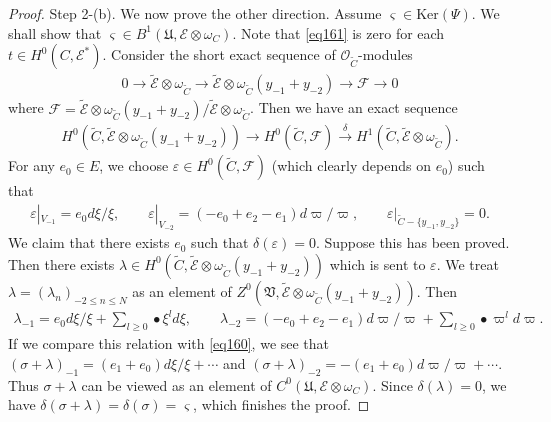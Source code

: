 \documentclass[12pt,a4paper,notitlepage]{report}
\theoremstyle{definition}
\theoremstyle{plain}
\newcommand{\fk}{\mathfrak}
\newcommand{\wtd}{\widetilde}
\newcommand{\scr}{\mathscr}
\newcommand{\sgm}{\varsigma}
\newcommand{\blt}{\bullet}
\newcommand{\Ker}{\mathrm{Ker}}
\numberwithin{equation}{section}
\begin{document}
\begin{proof}
Step 2-(b). We now prove the other direction. Assume $\sgm\in\Ker(\Psi)$. We shall show that $\sgm\in B^1(\fk U,\scr E\otimes\omega_C)$. Note that \eqref{eq161} is zero for each $t\in H^0(C,\scr E^*)$. Consider the short exact sequence of $\scr O_{\wtd C}$-modules
\begin{align*}
0\rightarrow\wtd{\scr E}\otimes\omega_{\wtd C}\rightarrow \wtd{\scr E}\otimes\omega_{\wtd C}(y_{-1}+y_{-2})\rightarrow \scr F\rightarrow 0
\end{align*}
where $\scr F=\wtd{\scr E}\otimes\omega_{\wtd C}(y_{-1}+y_{-2})/\wtd{\scr E}\otimes\omega_{\wtd C}$. Then we have an exact sequence
\begin{align*}
H^0(\wtd C,\wtd{\scr E}\otimes\omega_{\wtd C}(y_{-1}+y_{-2}))\rightarrow H^0(\wtd C,\scr F)\xrightarrow{\delta} H^1(\wtd C,\wtd{\scr E}\otimes\omega_{\wtd C}).
\end{align*}
For any $e_0\in E$, we choose $\varepsilon\in H^0(\wtd C,\scr F)$ (which clearly depends on $e_0$) such that
\begin{gather*}
\varepsilon|_{V_{-1}}=e_0d\xi/\xi,\qquad \varepsilon|_{V_{-2}}=(-e_0+e_2-e_1)d\varpi/\varpi ,\qquad  \varepsilon|_{\wtd C-\{y_{-1},y_{-2}\}}=0.
\end{gather*}
We claim that there exists $e_0$ such that $\delta(\varepsilon)=0$. Suppose this has been proved. Then there exists $\lambda\in H^0(\wtd C,\wtd{\scr E}\otimes\omega_{\wtd C}(y_{-1}+y_{-2}))$ which is sent to $\varepsilon$. We treat $\lambda=(\lambda_n)_{-2\leq n\leq N}$ as an element of $Z^0(\fk V,\wtd{\scr E}\otimes\omega_{\wtd C}(y_{-1}+y_{-2}))$. Then
\begin{align*}
\lambda_{-1}=e_0d\xi/\xi+\sum_{l\geq 0}\blt \xi^ld\xi,\qquad \lambda_{-2}=(-e_0+e_2-e_1)d\varpi/\varpi+\sum_{l\geq 0}\blt \varpi^ld\varpi.
\end{align*}
If we compare this relation with \eqref{eq160},  we see that $(\sigma+\lambda)_{-1}=(e_1+e_0)d\xi/\xi+\cdots$ and $(\sigma+\lambda)_{-2}=-(e_1+e_0)d\varpi/\varpi+\cdots$. Thus $\sigma+\lambda$ can be viewed as an element of $C^0(\fk U,\scr E\otimes\omega_C)$. Since $\delta(\lambda)=0$, we have $\delta(\sigma+\lambda)=\delta(\sigma)=\sgm$, which finishes the proof.



\end{proof}
\end{document}
